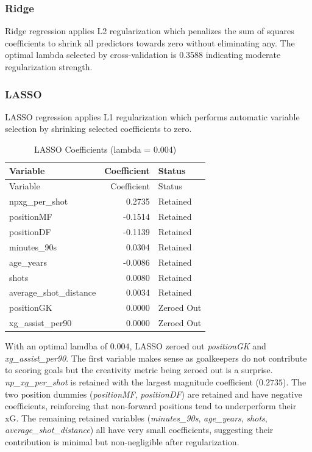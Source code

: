 \documentclass[
  letterpaper,
  DIV=11,
  numbers=noendperiod]{scrartcl}
\begin{document}
\subsubsection{Ridge}\label{ridge}

Ridge regression applies L2 regularization which penalizes the sum of
squares coefficients to shrink all predictors towards zero without
eliminating any. The optimal lambda selected by cross-validation is
0.3588 indicating moderate regularization strength.

\subsubsection{LASSO}\label{lasso}

LASSO regression applies L1 regularization which performs automatic
variable selection by shrinking selected coefficients to zero.

\begin{longtable}[]{@{}lrl@{}}
\caption{LASSO Coefficients (lambda = 0.004)}\tabularnewline
\toprule\noalign{}
Variable & Coefficient & Status \\
\midrule\noalign{}
\endfirsthead
\toprule\noalign{}
Variable & Coefficient & Status \\
\midrule\noalign{}
\endhead
\bottomrule\noalign{}
\endlastfoot
npxg\_per\_shot & 0.2735 & Retained \\
positionMF & -0.1514 & Retained \\
positionDF & -0.1139 & Retained \\
minutes\_90s & 0.0304 & Retained \\
age\_years & -0.0086 & Retained \\
shots & 0.0080 & Retained \\
average\_shot\_distance & 0.0034 & Retained \\
positionGK & 0.0000 & Zeroed Out \\
xg\_assist\_per90 & 0.0000 & Zeroed Out \\
\end{longtable}

With an optimal lamdba of \(0.004\), LASSO zeroed out \emph{positionGK}
and \emph{xg\_assist\_per90}. The first variable makes sense as
goalkeepers do not contribute to scoring goals but the creativity metric
being zeroed out is a surprise. \emph{np\_xg\_per\_shot} is retained
with the largest magnitude coefficient (\(0.2735\)). The two position
dummies (\emph{positionMF}, \emph{positionDF}) are retained and have
negative coefficients, reinforcing that non-forward positions tend to
underperform their xG. The remaining retained variables
(\emph{minutes\_90s}, \emph{age\_years}, \emph{shots},
\emph{average\_shot\_distance}) all have very small coefficients,
suggesting their contribution is minimal but non-negligible after
regularization.
\end{document}
